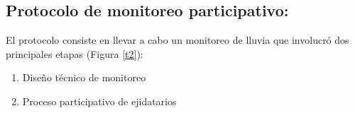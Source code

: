     
    
\subsection{Protocolo de monitoreo participativo:}

El protocolo consiste en llevar a cabo un monitoreo de lluvia que involucró dos principales etapas (Figura \ref{t2}): 
\begin{enumerate}
  \item Diseño técnico de monitoreo
  \item Proceso participativo de ejidatarios
\end{enumerate}

